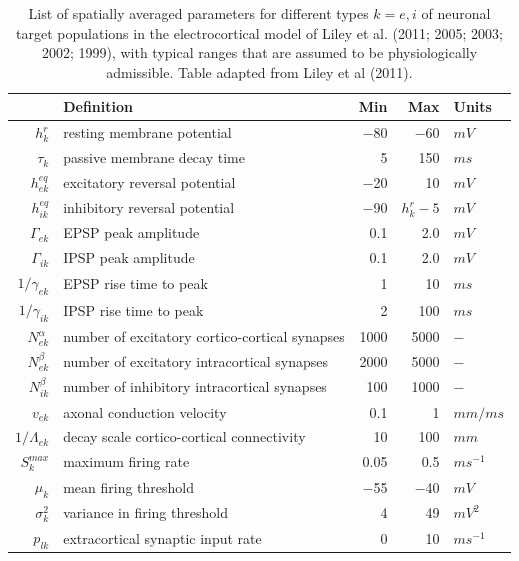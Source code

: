 \documentclass[a4paper,12pt]{article}
\begin{document}
\begin{table}[h]
\label{table:model_params} 
\begin{tabular}{r l r r l}
\hline 
 & Definition & Min & Max & Units \\
\hline
$h_k^r$ & resting membrane potential & −80 & −60 & $mV$ \\
$\tau_k$ & passive membrane decay time & 5 & 150 & $ms$ \\
$h_{ek}^{eq}$ & excitatory reversal potential & −20 & 10 & $mV$ \\
$h_{ik}^{eq}$ & inhibitory reversal potential & −90 & $h_k^r - 5$ & $mV$ \\
$\Gamma_{ek}$ & EPSP peak amplitude & 0.1 & 2.0 & $mV$ \\
$\Gamma_{ik}$ & IPSP peak amplitude & 0.1 & 2.0 & $mV$ \\
$1/\gamma_{ek}$ & EPSP rise time to peak & 1 & 10 & $ms$ \\
$1/\gamma_{ik}$ & IPSP rise time to peak & 2 & 100 & $ms$ \\
$N_{ek}^\alpha$ & number of excitatory cortico-cortical synapses & 1000 & 5000 & − \\
$N_{ek}^\beta$ & number of excitatory intracortical synapses & 2000 & 5000 & − \\
$N_{ik}^\beta$ & number of inhibitory intracortical synapses & 100 & 1000 & − \\
$v_{ek}$ & axonal conduction velocity & 0.1 & 1 & $mm/ms$ \\
$1 / \Lambda_{ek}$ & decay scale cortico-cortical connectivity & 10 & 100 & $mm$ \\
$S_k^{max}$ & maximum firing rate & 0.05 & 0.5 & $ms^{-1}$ \\
$\mu_k$ & mean firing threshold & −55 & −40 & $mV$ \\ 
$\sigma_k^2$ & variance in firing threshold & 4 & 49 & $mV^2$ \\
$p_{lk}$ & extracortical synaptic input rate & 0 & 10 & $ms^{-1}$ \\
\hline
\end{tabular}
\caption{List of spatially averaged parameters for different types $k = e,
i$ of neuronal target populations in the electrocortical model of Liley et
al. (2011; 2005; 2003; 2002; 1999), with typical ranges that are
assumed to be physiologically admissible. Table adapted from Liley et
al (2011).}
\end{table}
\end{document}
